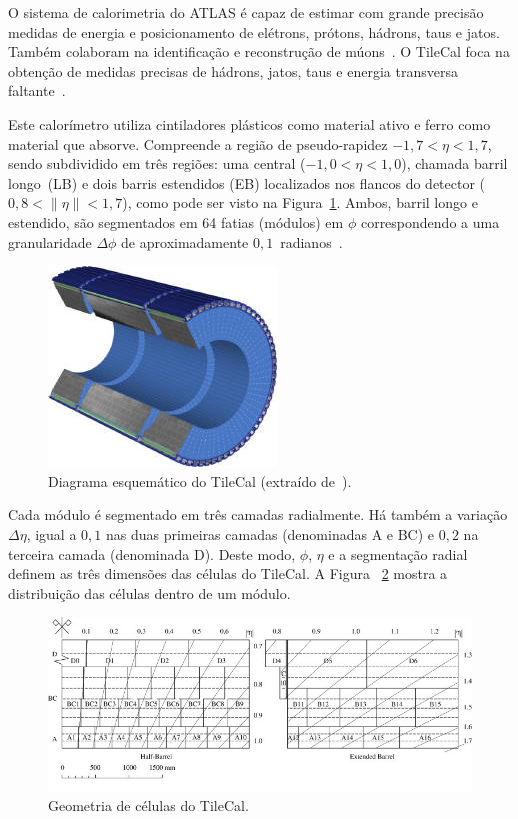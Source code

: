 O sistema de calorimetria do ATLAS é capaz de estimar com grande precisão
medidas de energia e posicionamento de elétrons, prótons, hádrons, taus e jatos.
Também colaboram na identificação e reconstrução de
múons~\cite{AAD2010READINESS}. O TileCal foca na obtenção de medidas precisas de
hádrons, jatos, taus e energia transversa faltante~\cite{MERMOD2008}.

Este calorímetro utiliza cintiladores plásticos como material ativo e ferro
como material que absorve. Compreende a região de pseudo-rapidez $-1,7 < \eta <
1,7$, sendo subdividido em três regiões: uma central  ($-1,0 < \eta < 1,0$),
chamada barril longo~(LB) e dois barris estendidos (EB) localizados nos flancos
do detector ( $0,8 < \|\eta\| < 1,7$), como pode ser visto na
Figura~\ref{fig:tilecalschema}. Ambos, barril longo e estendido, são
segmentados em 64 fatias (módulos) em $\phi$ correspondendo a uma granularidade
$\Delta\phi$ de aproximadamente $0,1$~radianos~\cite{DETECTOR1996TECHNICAL}.

\begin{figure}[htpb!]
    \centering
    \includegraphics{images/TILECAL_modules_schema.jpg}
    \caption[Diagrama esquemático do TileCal]{Diagrama esquemático do TileCal (extraído
    de~\cite{ref:atlas_www}).}
    \label{fig:tilecalschema}
\end{figure}

Cada módulo é segmentado em três camadas radialmente. Há também a variação
$\Delta\eta$,  igual a $0,1$ nas duas primeiras camadas (denominadas A e BC) e
$0,2$ na terceira camada (denominada D). Deste modo, $\phi$, $\eta$ e a
segmentação radial definem as três dimensões das células do TileCal.  A Figura
~\ref{fig:tilecalgeometry} mostra a distribuição das células dentro de um
módulo.

\begin{figure}[htpb!]
    \centering
    \includegraphics[width=\textwidth]{images/tile_geometry.jpg}
    \caption[Geometria de células do TileCal]{Geometria de células do TileCal.}
    \label{fig:tilecalgeometry}
\end{figure}


